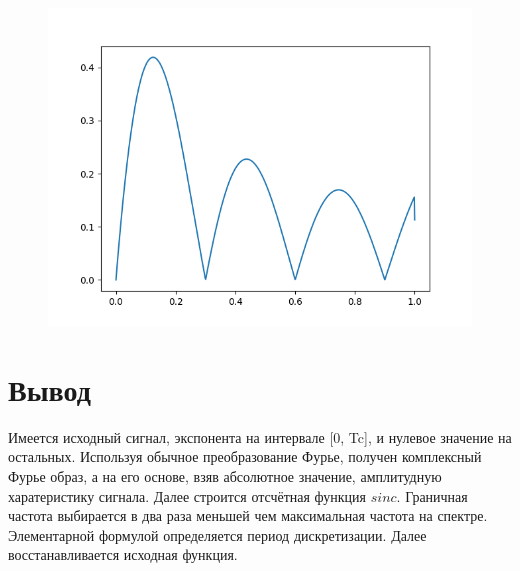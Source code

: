 \documentclass[12pt]{article}
\begin{document}
\begin{figure}[htp]
\centering
\includegraphics[scale=1.00]{error.png}
\caption{}
\label{}
\end{figure}

\section{Вывод}
Имеется исходный сигнал, экспонента на интервале [0, Tc], и нулевое значение на остальных. Используя обычное преобразование Фурье, получен комплексный Фурье образ, а на его основе, взяв абсолютное значение, амплитудную харатеристику сигнала. Далее строится отсчётная функция $sinc$. Граничная частота выбирается в два раза меньшей чем максимальная частота на спектре. Элементарной формулой определяется период дискретизации. Далее восстанавливается исходная функция.
\end{document}
